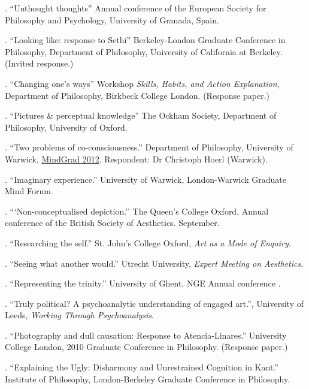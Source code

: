 \documentclass[11pt]{article}
\begin{document}
. ``Unthought thoughts'' Annual conference of the European Society for Philosophy and Psychology, University of Granada, Spain.

. ``Looking like: response to Sethi'' Berkeley-London Graduate Conference in Philosophy, Department of Philosophy, University of California at Berkeley. (Invited response.)

. ``Changing one's ways'' Workshop \emph{Skills, Habits, and Action Explanation}, Department of Philosophy, Birkbeck College London. (Response paper.)

. ``Pictures \& perceptual knowledge'' The Ockham Society, Department of Philosophy, University of Oxford.

. ``Two problems of co-consciousness.'' Department of Philosophy, University of Warwick, \href{http://www2.warwick.ac.uk/fac/soc/philosophy/news/conferences/mindgrad-2012/}{MindGrad 2012}. Respondent: Dr Christoph Hoerl (Warwick).

. ``Imaginary experience.'' University of Warwick, London-Warwick Graduate Mind Forum.


. ```Non-conceptualised depiction.'' The Queen's College Oxford, Annual conference of the British Society of Aesthetics. September.

. ``Researching the self.'' St. John's College Oxford, \emph{Art as a Mode of Enquiry}.

. ``Seeing what another would.'' Utrecht University, \emph{Expert Meeting on Aesthetics}.

. ``Representing the trinity.'' University of Ghent, NGE Annual conference .

. ``Truly political? A psychoanalytic understanding of engaged art.'', University of Leeds, \emph{Working Through Psychoanalysis}.

. ``Photography and dull causation: Response to Atencia-Linares.'' University College London, 2010 Graduate Conference in Philosophy. (Response paper.)

. ``Explaining the Ugly: Disharmony and Unrestrained Cognition in Kant.'' Institute of Philosophy, London-Berkeley Graduate Conference in Philosophy.

\bigskip
{}
\end{document}
